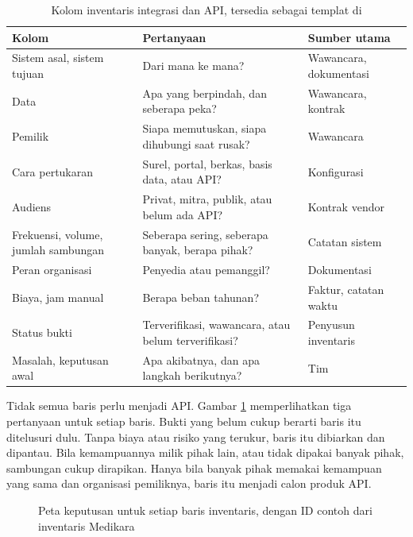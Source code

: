 \begin{table}[!htb]
  \centering
  \caption{Kolom inventaris integrasi dan API, tersedia sebagai templat di
           }
  \label{tab:ch04-kolom-inventaris}
  \small
  \begin{tabularx}{\textwidth}{K{2.8cm}JK{3.0cm}}
    \hline
    \textbf{Kolom} & \textbf{Pertanyaan} & \textbf{Sumber utama} \\ \hline
    Sistem asal, sistem tujuan & Dari mana ke mana? & Wawancara, dokumentasi \\ \hline
    Data & Apa yang berpindah, dan seberapa peka? & Wawancara, kontrak \\ \hline
    Pemilik & Siapa memutuskan, siapa dihubungi saat rusak? & Wawancara \\ \hline
    Cara pertukaran & Surel, portal, berkas, basis data, atau API? & Konfigurasi \\ \hline
    Audiens & Privat, mitra, publik, atau belum ada API? & Kontrak vendor \\ \hline
    Frekuensi, volume, jumlah sambungan & Seberapa sering, seberapa banyak, berapa pihak? & Catatan sistem \\ \hline
    Peran organisasi & Penyedia atau pemanggil? & Dokumentasi \\ \hline
    Biaya, jam manual & Berapa beban tahunan? & Faktur, catatan waktu \\ \hline
    Status bukti & Terverifikasi, wawancara, atau belum terverifikasi? & Penyusun inventaris \\ \hline
    Masalah, keputusan awal & Apa akibatnya, dan apa langkah berikutnya? & Tim \\ \hline
  \end{tabularx}
\end{table}

Tidak semua baris perlu menjadi API. Gambar \ref{fig:ch04-keputusan} memperlihatkan tiga pertanyaan untuk
setiap baris. Bukti yang belum cukup berarti baris itu ditelusuri dulu. Tanpa biaya atau risiko yang terukur,
baris itu dibiarkan dan dipantau. Bila kemampuannya milik pihak lain, atau tidak dipakai banyak pihak, sambungan
cukup dirapikan. Hanya bila banyak pihak memakai kemampuan yang sama dan organisasi pemiliknya, baris itu menjadi
calon produk API.

\begin{figure}[!htb]
  \centering
  
  \caption{Peta keputusan untuk setiap baris inventaris, dengan ID contoh dari inventaris Medikara}
  \label{fig:ch04-keputusan}
\end{figure}

